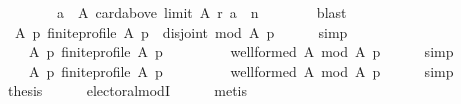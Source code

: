 \begin{isabellebody}
\ \ \ \ \ \ \ \ {\isacharbraceleft}{\kern0pt}a\ {\isasymin}\ A{\isachardot}{\kern0pt}\ card{\isacharparenleft}{\kern0pt}above\ {\isacharparenleft}{\kern0pt}limit\ A\ r{\isacharparenright}{\kern0pt}\ a{\isacharparenright}{\kern0pt}\ {\isachargreater}{\kern0pt}\ n{\isacharbraceright}{\kern0pt}\ {\isacharequal}{\kern0pt}\ {\isacharbraceleft}{\kern0pt}{\isacharbraceright}{\kern0pt}{\isachardoublequoteclose}\isanewline
\ \ \ \ \isamarkupfalse%
\ blast\isanewline
\ \ \isamarkupfalse%
\ {}{\isacharcolon}{\kern0pt}\ {\isachardoublequoteopen}{\isasymforall}A\ p{\isachardot}{\kern0pt}\ finite{\isacharunderscore}{\kern0pt}profile\ A\ p\ {\isasymlongrightarrow}\ disjoint{}\ {\isacharparenleft}{\kern0pt}{\isacharquery}{\kern0pt}mod\ A\ p{\isacharparenright}{\kern0pt}{\isachardoublequoteclose}\isanewline
\ \ \ \ \isamarkupfalse%
\ simp\isanewline
\ \ \isamarkupfalse%
\ {}\ {}\ \isamarkupfalse%
\isanewline
\ \ \ \ {\isachardoublequoteopen}{\isasymforall}A\ p{\isachardot}{\kern0pt}\ finite{\isacharunderscore}{\kern0pt}profile\ A\ p\ {\isasymlongrightarrow}\isanewline
\ \ \ \ \ \ \ \ well{\isacharunderscore}{\kern0pt}formed\ A\ {\isacharparenleft}{\kern0pt}{\isacharquery}{\kern0pt}mod\ A\ p{\isacharparenright}{\kern0pt}{\isachardoublequoteclose}\isanewline
\ \ \ \ \isamarkupfalse%
\ simp\isanewline
\ \ \isamarkupfalse%
\isanewline
\ \ \ \ {\isachardoublequoteopen}{\isasymforall}A\ p{\isachardot}{\kern0pt}\ finite{\isacharunderscore}{\kern0pt}profile\ A\ p\ {\isasymlongrightarrow}\isanewline
\ \ \ \ \ \ \ \ well{\isacharunderscore}{\kern0pt}formed\ A\ {\isacharparenleft}{\kern0pt}{\isacharquery}{\kern0pt}mod\ A\ p{\isacharparenright}{\kern0pt}{\isachardoublequoteclose}\isanewline
\ \ \ \ \isamarkupfalse%
\ simp\isanewline
\ \ \isamarkupfalse%
\ {\isacharquery}{\kern0pt}thesis\isanewline
\ \ \ \ \isamarkupfalse%
\ electoral{\isacharunderscore}{\kern0pt}modI\isanewline
\ \ \ \ \isamarkupfalse%
\ metis\isanewline
{}\isamarkupfalse%
%
\endisatagproof
{\isafoldproof}%
%
\isadelimproof
\isanewline
%
\endisadelimproof
%
\isadelimtheory
\isanewline
%
\endisadelimtheory
%
\isatagtheory
{}\isamarkupfalse%
%
\endisatagtheory
{\isafoldtheory}%
%
\isadelimtheory
%
\endisadelimtheory
%
\end{isabellebody}%
\endinput
